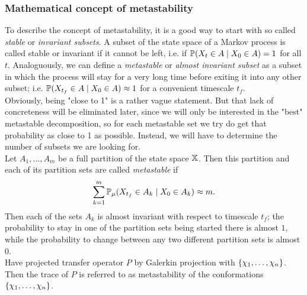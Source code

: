 \subsubsection*{Mathematical concept of metastability}

To describe the concept of metastability, it is a good way to start with so called \textit{stable} or \textit{invariant subsets}. A subset of the state space of a Markov process is called stable or invariant if it cannot be left, i.e. if $\mathbb{P}(X_t \in A \mid X_0 \in A) = 1$ for all $t$.
Analoguously, we can define a \textit{metastable} or \textit{almost invariant subset} as a subset in which the process will stay for a very long time before exiting it into any other subset; i.e. $\mathbb{P}(X_{t_f} \in A \mid X_0 \in A) \approx 1$ for a convenient timescale $t_f$.
\\

Obviously, being "close to 1" is a rather vague statement. But that lack of concreteness will be eliminated later,
since we will only be interested in the "best" metastable decomposition, so for each metastable set we try do get that probability as close to 1 as possible. Instead, we will have to determine the number of subsets we are looking for.
\\

Let $A_1,\dots,A_m$ be a full partition of the state space $\mathbb{X}$. Then this partition and each of its partition sets are called \textit{metastable} if
\begin{equation*}
\sum_{k=1}^m \mathbb{P}_\mu(X_{t_f} \in A_k \mid X_0 \in A_k) \approx m.
\end{equation*}
Then each of the sets $A_k$ is almost invariant with respect to timescale $t_f$;
the probability to stay in one of the partition sets being started there is almost $1$, while the probability to change between any two different partition sets is almost $0$.
\\

Have projected transfer operator $P$ by Galerkin projection with $\{\chi_1,\dots,\chi_n\}$. Then the trace of $P$ is referred to as metastability of the conformations $\{\chi_1,\dots,\chi_n\}$.

